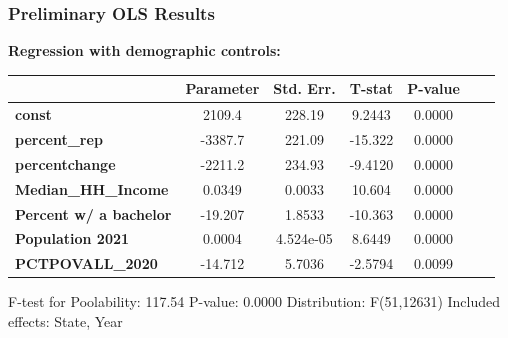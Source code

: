 \documentclass{beamer}
\begin{document}
\begin{frame}
\frametitle{Preliminary OLS Results}

\textbf{Regression with demographic controls:}

\vspace{5mm}

\begin{center}

\begin{tabular}{lcccccc}
                                                                      & \textbf{Parameter} & \textbf{Std. Err.} & \textbf{T-stat} & \textbf{P-value} \\
\midrule
\textbf{const}                                                        &       2109.4       &       228.19       &      9.2443     &      0.0000       \\
\textbf{percent\_rep}                                                 &      -3387.7       &       221.09       &     -15.322     &      0.0000      \\
\textbf{percentchange}                                                &      -2211.2       &       234.93       &     -9.4120     &      0.0000      \\
\textbf{Median\_HH\_Income}                                           &       0.0349       &       0.0033       &      10.604     &      0.0000     \\
\textbf{Percent w/ a bachelor}                                        &      -19.207       &       1.8533       &     -10.363     &      0.0000     \\
\textbf{Population 2021}                                              &       0.0004       &     4.524e-05      &      8.6449     &      0.0000      \\
\textbf{PCTPOVALL\_2020}                                              &      -14.712       &       5.7036       &     -2.5794     &      0.0099      \\
\bottomrule
\end{tabular}
\end{center}

F-test for Poolability: 117.54 \newline
P-value: 0.0000 \newline
Distribution: F(51,12631) \newline
\newline
Included effects: State, Year
\end{frame}
\end{document}
